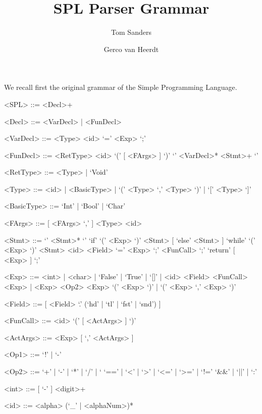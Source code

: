 \documentclass{article}
\title{SPL Parser Grammar}
\author{Tom Sanders \and Gerco van Heerdt}
\begin{document}
\maketitle

We recall first the original grammar of the Simple Programming Language.
\setlength{\grammarindent}{7em}
\begin{grammar}
    <SPL> ::= <Decl>+

    <Decl> ::= <VarDecl> | <FunDecl>

    <VarDecl> ::= <Type> <id> `=' <Exp> `;'

    <FunDecl> ::= <RetType> <id> `(' [ <FArgs> ] `)' `{' <VarDecl>* <Stmt>+ `}'

    <RetType> ::= <Type> | `Void'

    <Type> ::= <id> | <BasicType> | `(' <Type> `,' <Type> `)' | `[' <Type> `]'

    <BasicType> ::= `Int' | `Bool' | `Char'

    <FArgs> ::= [ <FArgs> `,' ] <Type> <id>

    <Stmt> ::= `{' <Stmt>* `}'
    \alt `if' `(' <Exp> `)' <Stmt> [ `else' <Stmt> ]
    \alt `while' `(' <Exp> `)' <Stmt>
    \alt <id> <Field> `=' <Exp> `;'
    \alt <FunCall> `;'
    \alt `return' [ <Exp> ] `;'

    <Exp> ::= <int> | <char> | `False' | `True' | `[]' | <id> <Field>
    \alt <FunCall>
     <Exp> | <Exp> <Op2> <Exp>
    \alt `(' <Exp> `)' | `(' <Exp> `,' <Exp> `)'

    <Field> ::= [ <Field> `.' (`hd' | `tl' | `fst' | `snd') ]

    <FunCall> ::= <id> `(' [ <ActArgs> ] `)'

    <ActArgs> ::= <Exp> [ `,' <ActArgs> ]

    <Op1> ::= `!' | `-'

    <Op2> ::= `+' | `-' | `*' | `/' | `%
    \alt `==' | `<' | `>' | `<=' | `>=' | `!='
    \alt `&&' | `||' | `:'

    <int> ::= [ `-' ] <digit>+

    <id> ::= <alpha> (`_' | <alphaNum>)*
\end{grammar}
\end{document}
